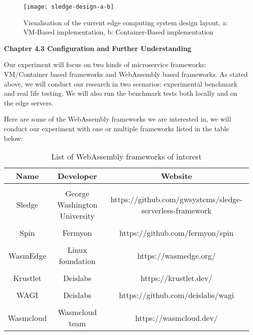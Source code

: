 \bigskip

\begin{figure}[hp]
\centering
\texttt{[image: sledge-design-a-b]}
\caption{\footnotesize{Visualisation of the current edge computing system design layout, a: VM-Based implementation, b: Container-Based implementation}}
\captionsetup{aboveskip=0pt,font=it}
\label{fig:javascript_meme}
\end{figure}

\bigskip
\bigskip

\textbf{{\Large Chapter 4.3 Configuration and Further Understanding}}

\bigskip

Our experiment will focus on two kinds of microservice frameworks: VM/Container based frameworks and WebAssembly based frameworks. As stated above, we will conduct our research in two scenarios: experimental benchmark and real life testing. We will also run the benchmark tests both locally and on the edge servers.

Here are some of the WebAssembly frameworks we are interested in, we will conduct our experiment with one or multiple frameworks listed in the table below:

\bigskip

\begin{table}[h!]
\centering
\begin{tabular}{||c c c||} 
\hline
Name & Developer & Website \\ [0.5ex] 
\hline\hline
 & & \\
Sledge & George Washington University & https://github.com/gwsystems/sledge-serverless-framework \\ 
 & & \\
Spin & Fermyon & https://github.com/fermyon/spin \\
 & & \\
WasmEdge & Linux foundation & https://wasmedge.org/ \\
 & & \\
Krustlet & Deislabs & https://krustlet.dev/ \\
 & & \\
WAGI & Deislabs & https://github.com/deislabs/wagi \\
 & & \\
Wasmcloud & Wasmcloud team & https://wasmcloud.dev/ \\ [1ex] 
\hline
\end{tabular}
\caption{List of WebAssembly frameworks of interest}
\label{table:1}
\end{table}

